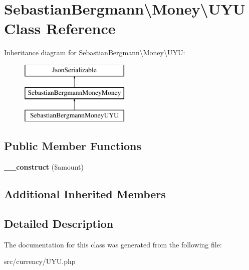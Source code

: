\hypertarget{classSebastianBergmann_1_1Money_1_1UYU}{}\section{Sebastian\+Bergmann\textbackslash{}Money\textbackslash{}U\+Y\+U Class Reference}
\label{classSebastianBergmann_1_1Money_1_1UYU}
Inheritance diagram for Sebastian\+Bergmann\textbackslash{}Money\textbackslash{}U\+Y\+U\+:\begin{figure}[H]
\begin{center}
\leavevmode
\includegraphics[height=3.000000cm]{classSebastianBergmann_1_1Money_1_1UYU}
\end{center}
\end{figure}
\subsection*{Public Member Functions}
\begin{DoxyCompactItemize}
\item 
\hypertarget{classSebastianBergmann_1_1Money_1_1UYU_a2232caa29638208ae093f8d9a67285c5}{}{\bfseries \+\_\+\+\_\+construct} (\$amount)\label{classSebastianBergmann_1_1Money_1_1UYU_a2232caa29638208ae093f8d9a67285c5}

\end{DoxyCompactItemize}
\subsection*{Additional Inherited Members}


\subsection{Detailed Description}


The documentation for this class was generated from the following file\+:\begin{DoxyCompactItemize}
\item 
src/currency/U\+Y\+U.\+php\end{DoxyCompactItemize}
